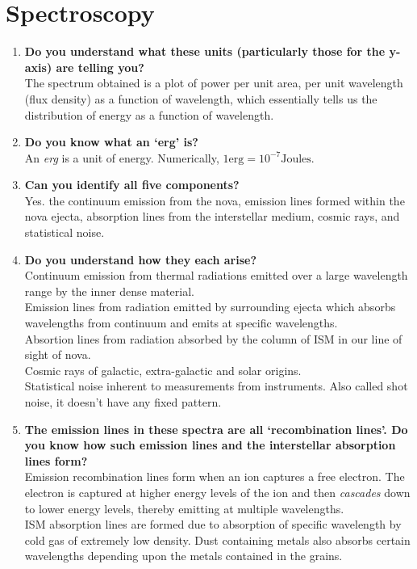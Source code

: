 \documentclass{article}
\begin{document}
	\section{Spectroscopy}
	\begin{enumerate}

		\item \textbf{Do you understand what these units (particularly those for the y-axis) are telling you?} \\
		The spectrum obtained is a plot of power per unit area, per unit wavelength (flux density) as a function of wavelength, which essentially tells us the distribution of energy as a function of wavelength.

		\item \textbf{Do you know what an ‘erg’ is?} \\
		An \emph{erg} is a unit of energy. Numerically, \(1 \textrm{erg} = 10^{-7} \textrm{Joules}\).

		\item \textbf{Can you identify all five components?} \\
		Yes. the continuum emission from the nova, emission lines formed within the nova ejecta, absorption lines from the interstellar medium, cosmic rays, and statistical noise. 

		\item \textbf{Do you understand how they each arise?} \\
		Continuum emission from thermal radiations emitted over a large wavelength range by the inner dense material. \\
		Emission lines from radiation emitted by surrounding ejecta which absorbs wavelengths from continuum and emits at specific wavelengths. \\
		Absortion lines from radiation absorbed by the column of ISM in our line of sight of nova. \\
		Cosmic rays of galactic, extra-galactic and solar origins. \\
		Statistical noise inherent to measurements from instruments. Also called shot noise, it doesn't have any fixed pattern.

		\item \textbf{The emission lines in these spectra are all ‘recombination lines’. Do you know how such emission lines and the interstellar absorption lines form?} \\
		Emission recombination lines form when an ion captures a free electron. The electron is captured at higher energy levels of the ion and then \emph{cascades} down to lower energy levels, thereby emitting at multiple wavelengths. \\
		ISM absorption lines are formed due to absorption of specific wavelength by cold gas of extremely low density. Dust containing metals also absorbs certain wavelengths depending upon the metals contained in the grains.


\end{enumerate}
\end{document}
